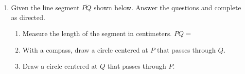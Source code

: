 \documentclass[12pt, twoside]{article}
\begin{document}
\begin{enumerate}
\item Given the line segment $\overline{PQ}$ shown below. Answer the questions and complete as directed.
    \begin{enumerate}
      \item Measure the length of the segment in centimeters. $PQ=$
      \bigskip
      \item With a compass, draw a circle centered at $P$ that passes through $Q$.
      \bigskip
      \item Draw a circle centered at $Q$ that passes through $P$.
    \end{enumerate}
    \vspace{5cm}
    \begin{center}
    \end{center}
  
\end{enumerate}
\end{document}
